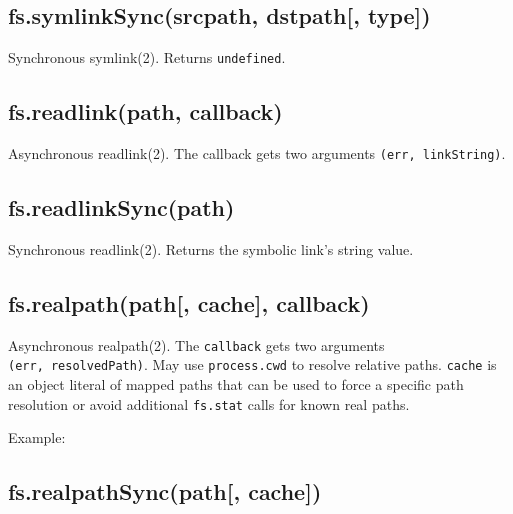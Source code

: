 \subsection{fs.symlinkSync(srcpath, dstpath{[},
type{]})}\label{fs.symlinksyncsrcpath-dstpath-type}

Synchronous symlink(2). Returns \texttt{undefined}.

\subsection{fs.readlink(path, callback)}\label{fs.readlinkpath-callback}

Asynchronous readlink(2). The callback gets two arguments
\texttt{(err,\ linkString)}.

\subsection{fs.readlinkSync(path)}\label{fs.readlinksyncpath}

Synchronous readlink(2). Returns the symbolic link's string value.

\subsection{fs.realpath(path{[}, cache{]},
callback)}\label{fs.realpathpath-cache-callback}

Asynchronous realpath(2). The \texttt{callback} gets two arguments
\texttt{(err,\ resolvedPath)}. May use \texttt{process.cwd} to resolve
relative paths. \texttt{cache} is an object literal of mapped paths that
can be used to force a specific path resolution or avoid additional
\texttt{fs.stat} calls for known real paths.

Example:

\begin{Shaded}
\begin{Highlighting}[]
 \NormalTok{:}\NormalTok{\};}
\NormalTok{(} 
    
\NormalTok{\});}
\end{Highlighting}
\end{Shaded}

\subsection{fs.realpathSync(path{[},
cache{]})}\label{fs.realpathsyncpath-cache}

